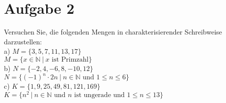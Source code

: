 \section*{Aufgabe 2}

Versuchen Sie, die folgenden Mengen in charakterisierender Schreibweise darzustellen:\\

a) $M = \{3, 5, 7, 11, 13, 17\}$\\

$M = \{x \in \mathbb{N} \ | \ x \text{ ist Primzahl}\}$\\

b) $N = \{-2, 4, -6, 8, -10, 12\}$\\

$N = \{(-1)^n \cdot 2n \ | \ n \in \mathbb{N} \text{ und } 1 \leq n \leq 6\}$\\

c) $K = \{1, 9, 25, 49, 81, 121, 169\}$\\

$K = \{n^2 \ | \ n \in \mathbb{N} \text{ und } n \text{ ist ungerade und } 1 \leq n \leq 13\}$\\